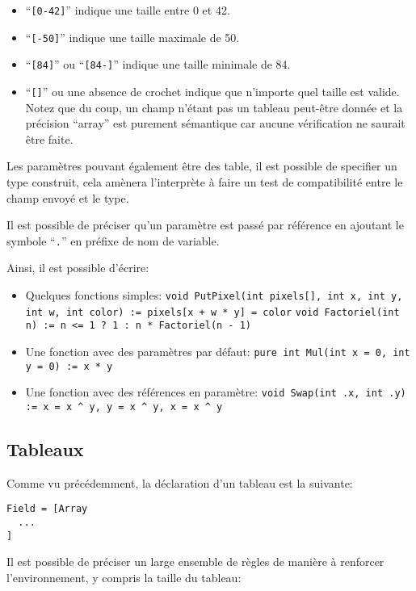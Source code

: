 \documentclass[a5paper, 12pt]{book}
\begin{document}
\begin{itemize}
  \item ``\verb![0-42]!'' indique une taille entre 0 et 42.
  \item ``\verb![-50]!'' indique une taille maximale de 50.
  \item ``\verb![84]!'' ou ``\verb![84-]!'' indique une taille minimale de 84.
  \item ``\verb![]!'' ou une absence de crochet indique que n'importe
    quel taille est valide. Notez que du coup, un champ n'étant
    pas un tableau peut-être donnée et la précision ``array''
    est purement sémantique car aucune vérification ne saurait
    être faite.
\end{itemize}

Les paramètres pouvant également être des table, il est possible
de specifier un type construit, cela amènera l'interprète à faire
un test de compatibilité entre le champ envoyé et le type.

Il est possible de préciser qu'un paramètre est passé par référence
en ajoutant le symbole ``\verb!.!'' en préfixe de nom de variable.

Ainsi, il est possible d'écrire:

\begin{itemize}
  \item Quelques fonctions simples:
    \verb!void PutPixel(int pixels[], int x, int y, int w, int color) := pixels[x + w * y] = color!
    \verb!void Factoriel(int n) := n <= 1 ? 1 : n * Factoriel(n - 1)!
  \item Une fonction avec des paramètres par défaut:
    \verb!pure int Mul(int x = 0, int y = 0) := x * y!
  \item Une fonction avec des références en paramètre:
    \verb!void Swap(int .x, int .y) := x = x ^ y, y = x ^ y, x = x ^ y!
\end{itemize}

\subsection{Tableaux}

Comme vu précédemment, la déclaration d'un tableau est la suivante:\\

\begin{verbatim}
Field = [Array
  ...
]
\end{verbatim}

Il est possible de préciser un large ensemble de règles de manière
à renforcer l'environnement, y compris la taille du tableau:\\
\end{document}
